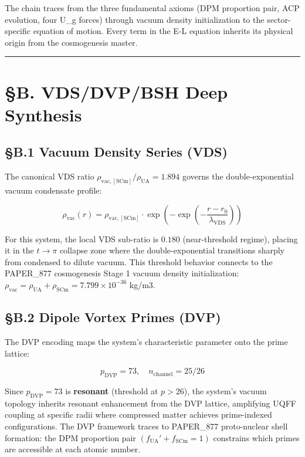 \documentclass[12pt,a4paper]{article}
\begin{document}
The chain traces from the three fundamental axioms (DPM proportion pair, ACP evolution, four U\_g forces) through vacuum density initialization to the sector-specific equation of motion. Every term in the E-L equation inherits its physical origin from the cosmogenesis master.

\medskip\hrule\medskip

\section{\S{}B. VDS/DVP/BSH Deep Synthesis}

\subsection{\S{}B.1 Vacuum Density Series (VDS)}

The canonical VDS ratio $\rho_{\mathrm{vac,[SCm]}} / \rho_{\mathrm{UA}} = 1.894$ governs the double-exponential vacuum condensate profile:

\begin{equation}
\rho_{\mathrm{vac}}(r) = \rho_{\mathrm{vac,[SCm]}} \cdot \exp\!\left(-\exp\!\left(-\frac{r - r_0}{\lambda_{\mathrm{VDS}}}\right)\right)
\end{equation}

For this system, the local VDS sub-ratio is $0.180$ (near-threshold regime), placing it in the $t \to \pi$ collapse zone where the double-exponential transitions sharply from condensed to dilute vacuum. This threshold behavior connects to the PAPER\_877 cosmogenesis Stage 1 vacuum density initialization: $\rho_{\mathrm{vac}} = \rho_{\mathrm{UA}} + \rho_{\mathrm{SCm}} = 7.799 \times 10^{-36}$ kg/m3.

\subsection{\S{}B.2 Dipole Vortex Primes (DVP)}

The DVP encoding maps the system's characteristic parameter onto the prime lattice:

\begin{equation}
p_{\mathrm{DVP}} = 73, \quad n_{\mathrm{channel}} = 25/26
\end{equation}

Since $p_{\mathrm{DVP}} = 73$ is \textbf{resonant} (threshold at $p > 26$), the system's vacuum topology inherits resonant enhancement from the DVP lattice, amplifying UQFF coupling at specific radii where compressed matter achieves prime-indexed configurations. The DVP framework traces to PAPER\_877 proto-nuclear shell formation: the DPM proportion pair $(f_{\mathrm{UA}}' + f_{\mathrm{SCm}} = 1)$ constrains which primes are accessible at each atomic number.
\end{document}

